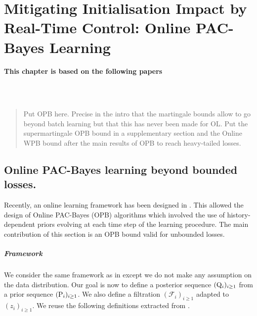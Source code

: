 \chapter[Mitigating Initialisation Impact by Real-Time Control: Online PAC-Bayes Learning]{Mitigating Initialisation Impact by Real-Time Control: Online PAC-Bayes Learning}
\label{chap:online-pb}

\addchapterlof
\addchapterloa
\addchapterloe

\vspace{-1.0cm}
\begin{center}
\textbf{This chapter is based on the following papers}\\[0.1cm]
\end{center}
\\
\\

\vspace{0.2cm}
\minitoc

\begin{abstract}
Put OPB here. Precise in the intro that the martingale bounds allow to go beyond batch learning but that this has never been made for OL. Put the supermartingale OPB bound in a supplementary section and the Online WPB bound after the main results of OPB to reach heavy-tailed losses. 
\end{abstract}


\section{Online PAC-Bayes learning beyond bounded losses.}
\label{sec: main_result_onl}

Recently, an online learning framework has been designed in \citet{haddouche2022online}. This allowed the design of Online PAC-Bayes (OPB) algorithms which involved the use of history-dependent priors evolving at each time step of the learning procedure. The main contribution of this section is an OPB bound valid for unbounded losses.

\paragraph{Framework} We consider the same framework as in  except we do not make any assumption on the data distribution. Our goal is now to define a posterior sequence $(\Q_i)_{i\geq 1}$ from a prior sequence $(\P_i)_{i\geq 1}$. We also define a filtration $(\mathcal{F}_{i})_{i\geq 1}$ adapted to $(z_i)_{i\geq 1}$. We reuse the following definitions extracted from \cite{haddouche2022online}.

